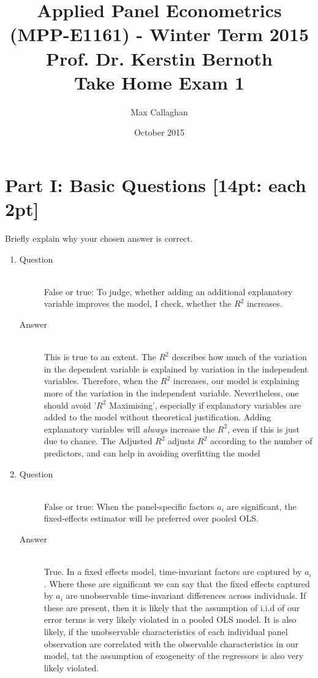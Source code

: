 \documentclass{article}
\begin{document}
\title{\small Applied Panel Econometrics (MPP-E1161) - Winter Term 2015 \\ Prof. Dr. Kerstin Bernoth \\ \bigskip \Large Take Home Exam 1}
\author{Max Callaghan}
\date{October 2015}
\maketitle

\section{Part I: Basic Questions [14pt: each 2pt]}
Briefly explain why your chosen answer is correct.
\begin{enumerate}
  \item
  \begin{description}
    \item[Question] \hfill \\
    False or true: To judge, whether adding an additional explanatory variable improves the model, I check, whether the $R^{2}$ increases.
    \item[Answer] \hfill \\
    This is true to an extent. The $R^2$ describes how much of the variation in the dependent variable is explained by variation in the independent variables. Therefore, when the $R^2$ increases, our model is explaining more of the variation in the independent variable. Nevertheless, one should avoid '$R^2$ Maximising', especially if explanatory variables are added to the model without theoretical justification. Adding explanatory variables will \textit{always} increase the $R^2$, even if this is just due to chance. The Adjusted $R^2$ adjusts $R^2$ according to the number of predictors, and can help in avoiding overfitting the model
  \end{description}
  
  \item
  \begin{description}
    \item[Question] \hfill \\
    False or true: When the panel-specific factors $a_i$ are significant, the fixed-effects estimator will be preferred over pooled OLS.
    \item[Answer] \hfill \\
    True. In a fixed effects model, time-invariant factors are captured by $a_i$. Where these are significant we can say that the fixed effects captured by $a_i$ are unobservable time-invariant differences across individuals. If these are present, then it is likely that the assumption of i.i.d of our error terms is very likely violated in a pooled OLS model. It is also likely, if the unobservable characteristics of each individual panel observation are correlated with the observable characteristics in our model, tat the assumption of exogeneity of the regressors is also very likely violated.
  \end{description}
  

\end{enumerate}
\end{document}
